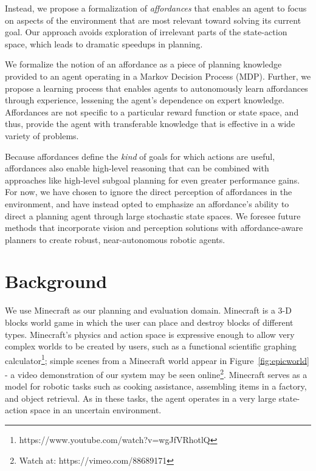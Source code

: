 \documentclass[conference]{IEEEtran}
\begin{document}
Instead, we propose a formalization of {\em affordances} \citep{gibson77} that enables an agent to focus on
aspects of the environment that are most relevant toward solving its current goal. Our approach avoids exploration of irrelevant parts of the 
state-action space, which leads to dramatic speedups in planning.

We formalize the notion of an affordance as a piece of planning
knowledge provided to an agent operating in a Markov Decision
Process (MDP). Further, we propose a learning process that
enables agents to autonomously learn affordances through experience, lessening
the agent's dependence on expert knowledge. Affordances are not specific to a particular reward 
function or state space, and thus, provide the agent with transferable 
knowledge that is effective in a wide variety of problems. 

Because affordances
define the {\em kind} of goals for which actions are useful,
affordances also enable high-level reasoning that can
be combined with approaches like high-level subgoal planning for even
greater performance gains. For now, we have chosen to ignore the direct 
perception of affordances in the environment, and have instead opted to emphasize an
affordance's ability to direct a planning agent through large stochastic state spaces. We foresee
future methods that incorporate vision and perception solutions with affordance-aware planners
to create robust, near-autonomous robotic agents.

\section{Background}
\label{sec:background}
We use Minecraft as our planning and evaluation domain. Minecraft is a
3-D blocks world game in which the user can place and destroy blocks
of different types.  Minecraft's physics and action space is expressive
enough to allow very complex worlds to be created by users, such as a
functional scientific graphing calculator\footnote{https://www.youtube.com/watch?v=wgJfVRhotlQ};
simple scenes from a Minecraft world appear in Figure~\ref{fig:epicworld} - a video demonstration of our system may be seen online\footnote{Watch at: https://vimeo.com/88689171}. Minecraft serves as a model for robotic tasks such as cooking assistance, assembling items in a factory, and object retrieval.  As in these tasks,  the agent operates in a very large state-action space in an uncertain environment.
\end{document}
